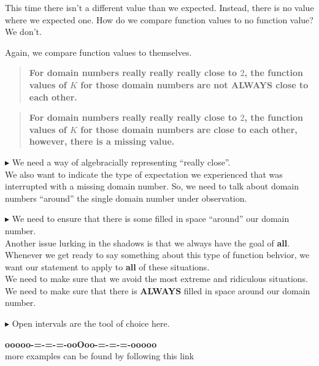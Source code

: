 \documentclass{ximera}
\begin{document}
This time there isn't a different value than we expected.  Instead, there is no value where we expected one. How do we compare function values to no function value? \\

We don't.

Again, we compare function values to themselves. \\


\begin{quote}
 \textbf{\textcolor{blue!55!black}{For domain numbers really really really close to $2$, the function values of $K$ for those domain numbers are not ALWAYS close to each other.}} 
\end{quote}


\begin{quote}
 \textbf{\textcolor{blue!55!black}{For domain numbers really really really close to $2$, the function values of $K$ for those domain numbers are close to each other, however, there is a missing value.}} 
\end{quote}




\textbf{\textcolor{red!70!darkgray}{$\blacktriangleright$}} We need a way of algebracially representing ``really close''.  \\


We also want to indicate the type of expectation we experienced that was interrupted with a missing domain number. So, we need to talk about domain numbers ``around'' the single domain number under observation. 


\textbf{\textcolor{red!70!darkgray}{$\blacktriangleright$}} We need to ensure that there is some filled in space ``around'' our domain number. \\





Another issue lurking in the shadows is that we always have the goal of \textbf{\textcolor{red!70!black}{all}}. Whenever we get ready to say something about this type of function behvior, we want our statement to apply to \textbf{\textcolor{red!70!black}{all}} of these situations. \\

We need to make sure that we avoid the most extreme and ridiculous situations.  We need to make sure that there is \textbf{\textcolor{red!70!black}{ALWAYS}} filled in space around our domain number.




\textbf{\textcolor{red!70!darkgray}{$\blacktriangleright$}} Open intervals are the tool of choice here.














\begin{center}
\textbf{\textcolor{green!50!black}{ooooo-=-=-=-ooOoo-=-=-=-ooooo}} \\

more examples can be found by following this link\\ 

\end{center}
\end{document}
